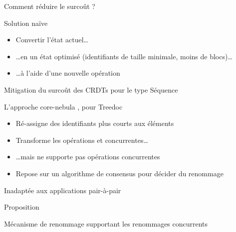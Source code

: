 \begin{frame}[fragile]{Comment réduire le surcoût ?}
\begin{block}{Solution naïve}
\begin{figure}
{
            }
          \end{figure}
          \begin{itemize}
            \item \alert{Convertir l'état} actuel\dots
            \item<2-> \dots \alert{en un état optimisé} (identifiants de taille minimale, moins de blocs)\dots
            \item<3-> \dots à l'aide d'une \alert{nouvelle opération}
          \end{itemize}
    \end{block}
\end{frame}

\begin{frame}{Mitigation du surcoût des CRDTs pour le type Séquence}
    \begin{block}{L'approche core-nebula  \cite{zawirski:hal-01248197}, pour Treedoc}
        \begin{itemize}
            \item Ré-assigne des identifiants plus courts aux éléments
            \item Transforme les opérations \ins et \rmv concurrentes\dots
            \pause
            \item \dots mais ne supporte pas opérations \ren concurrentes
            \item Repose sur un algorithme de consensus pour décider du renommage
        \end{itemize}
    \end{block}
    \pause
    \begin{center}
        \alert{Inadaptée aux applications pair-à-pair}
    \end{center}
\end{frame}

\begin{frame}[standout]
    \alert{Proposition}

    Mécanisme de renommage supportant les renommages concurrents
\end{frame}
